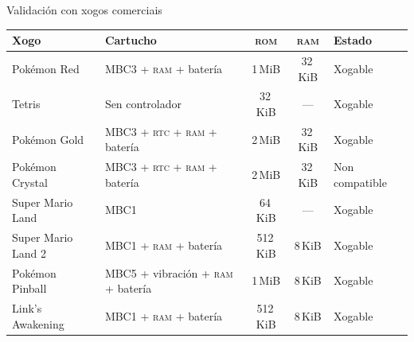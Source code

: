 \begin{frame}{Validación con xogos comerciais}
  \begin{center}
    {\footnotesize
    \begin{tabular}{l|l|c|c|l}
      \rowcolor{udcpink!25}
      \textbf{Xogo} & \textbf{Cartucho} & \textbf{\textsc{rom}} & \textbf{\textsc{ram}} & \textbf{Estado} \\\hline
      Pokémon Red        & MBC3 + \textsc{ram} + batería                  & 1\,MiB   & 32\,KiB & Xogable \\
      Tetris             & Sen controlador                                 & 32\,KiB  & ---     & Xogable \\
      Pokémon Gold       & MBC3 + \textsc{rtc} + \textsc{ram} + batería    & 2\,MiB   & 32\,KiB & Xogable \\
      Pokémon Crystal    & MBC3 + \textsc{rtc} + \textsc{ram} + batería    & 2\,MiB   & 32\,KiB & Non compatible \\
      Super Mario Land   & MBC1                                            & 64\,KiB  & ---     & Xogable \\
      Super Mario Land 2 & MBC1 + \textsc{ram} + batería                   & 512\,KiB & 8\,KiB  & Xogable \\
      Pokémon Pinball    & MBC5 + vibración + \textsc{ram} + batería       & 1\,MiB   & 8\,KiB  & Xogable \\
      Link's Awakening   & MBC1 + \textsc{ram} + batería                   & 512\,KiB & 8\,KiB  & Xogable \\
    \end{tabular}}\\[0.4em]
  \end{center}
\end{frame}
